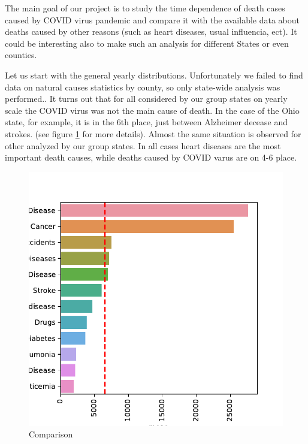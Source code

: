 \documentclass[conference]{IEEEtran}
\begin{document}
The main goal of our project is to study the time dependence of death cases caused by COVID virus pandemic and compare it with the available data about deaths caused by other reasons (such as heart diseases, usual influencia, ect). It could be interesting also to make such an analysis for different States or even counties.

Let us start with the general yearly distributions. Unfortunately we failed to find data on natural causes statistics by county, so only state-wide analysis was performed.. It turns out that for all considered by our group states on yearly scale the COVID virus was not the main cause of death. In the case of the Ohio state, for example, it is in the 6th place, just between Alzheimer decease and strokes. (see figure \ref{fig:yearly_deaths} for more details). Almost the same situation is observed for other analyzed by our group states. In all cases heart diseases are the most important death causes, while deaths caused by COVID varus are on 4-6 place.


\begin{figure}
  \centering
  \includegraphics[width=0.9\columnwidth]{figs/yearly_deaths}
  \caption{Comparison}
  \label{fig:yearly_deaths}
\end{figure}
\end{document}
